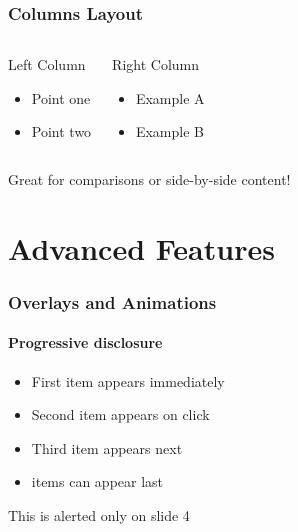 \documentclass{beamer}
\begin{document}
\begin{frame}
\frametitle{Columns Layout}

\begin{columns}[T]
\begin{block}{Left Column}
    \begin{itemize}
        \item Point one
        \item Point two
    \end{itemize}
\end{block}

\begin{exampleblock}{Right Column}
    \begin{itemize}
        \item Example A
        \item Example B
    \end{itemize}
\end{exampleblock}
\end{columns}

\vspace{1em}
Great for comparisons or side-by-side content!
\end{frame}

\section{Advanced Features}

\begin{frame}
\frametitle{Overlays and Animations}
\framesubtitle{Progressive disclosure}

\begin{itemize}
    \item<1-> First item appears immediately
    \item<2-> Second item appears on click
    \item<3-> Third item appears next
    \item<4->  items can appear last
\end{itemize}

\vspace{1em}


\vspace{1em}

\alert<4>{This is alerted only on slide 4}
\end{frame}
\end{document}
